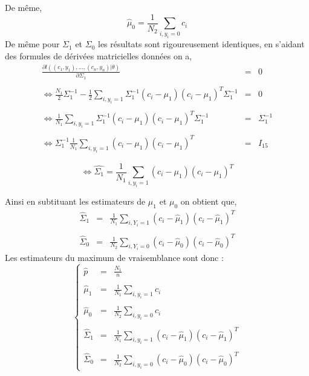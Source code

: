 \documentclass[10pt,a4paper]{report}\usepackage[]{graphicx}\usepackage[]{color}
\begin{document}
De m\^eme, 
$$
\hat \mu_0 =  \frac{1}{N_2}\sum_{i,y_i = 0} c_i
$$
De m\^eme pour $\Sigma_1$ et $\Sigma_0$ les r\'esultats sont rigoureusement identiques, en s'aidant des formules de dérivées matricielles données on a,
$$
\begin{array}{rcl}
\displaystyle{\frac{\partial l((c_1,y_1),\hdots,(c_n,y_n)|\theta)}{\partial\Sigma_1}} & = & 0 \\ \\
\displaystyle{\Leftrightarrow \frac{N_1}{2}\Sigma_1^{-1} -  \frac{1}{2}\sum_{i,y_i=1} \Sigma_1^{-1}(c_i-\mu_1)(c_i-\mu_1)^T\Sigma_1^{-1}} & = & 0 \\ \\
\displaystyle{\Leftrightarrow \frac{1}{N_1}\sum_{i,y_i=1} \Sigma_1^{-1}(c_i-\mu_1)(c_i-\mu_1)^T\Sigma_1^{-1}} & = & \displaystyle{ \Sigma_1^{-1}} \\ \\
\displaystyle{\Leftrightarrow \Sigma_1^{-1}\frac{1}{N_1}\sum_{i,y_i=1}(c_i-\mu_1)(c_i-\mu_1)^T} &= & \displaystyle{I_{15}}
\end{array}
$$

\[ \Leftrightarrow \hat{\Sigma_1} = \frac{1}{N_1}\sum_{i,y_i=1}(c_i-\mu_1)(c_i-\mu_1)^T\]


Ainsi en subtituant les estimateurs de $\mu_1$ et $\mu_0$ on obtient que,
$$
\begin{array}{rcl}
\displaystyle{\hat \Sigma_1} & = & \displaystyle{\frac{1}{N_1}\sum_{i,Y_i=1}(c_i-\hat \mu_1)(c_i-\hat \mu_1)^T} \\ \\
\displaystyle{\hat \Sigma_0} & = & \displaystyle{\frac{1}{N_2}\sum_{i,Y_i=0}(c_i-\hat \mu_0)(c_i-\hat \mu_0)^T}
\end{array}
$$
Les estimateurs du maximum de vraisemblance sont donc :
$$
\left \{
\begin{array}{rcl}
\hat{p} & = & \displaystyle{\frac{N_1}{n}} \\ \\
\displaystyle{\hat \mu_1} & = & \displaystyle{\frac{1}{N_1}\sum_{i,y_i = 1} c_i} \\ \\
\hat \mu_0 & = &  \displaystyle{\frac{1}{N_2}\sum_{i,y_i = 0} c_i} \\ \\
\displaystyle{\hat \Sigma_1} & = & \displaystyle{\frac{1}{N_1}\sum_{i,y_i=1}(c_i-\hat{\mu}_1)(c_i-\hat{\mu}_1)^T} \\ \\
\displaystyle{\hat \Sigma_0} & = & \displaystyle{\frac{1}{N_2}\sum_{i,y_i=0}(c_i-\hat{\mu}_0)(c_i-\hat{\mu}_0)^T}
\end{array}
\right.
$$
\end{document}
